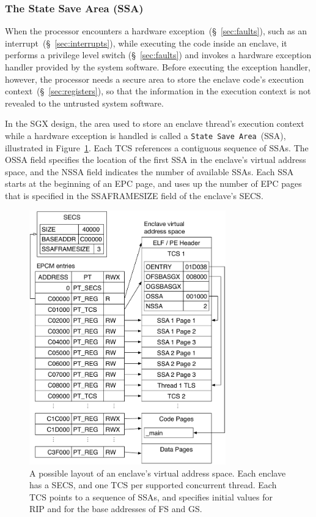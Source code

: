 \subsubsection{The State Save Area (SSA)}
\label{sec:sgx_ssa}


When the processor encounters a hardware exception~(\S~\ref{sec:faults}), such
as an interrupt~(\S~\ref{sec:interrupts}), while executing the code inside an
enclave, it performs a privilege level switch (\S~\ref{sec:faults}) and invokes
a hardware exception handler provided by the system software. Before executing
the exception handler, however, the processor needs a secure area to store the
enclave code's execution context~(\S~\ref{sec:registers}), so that the
information in the execution context is not revealed to the untrusted system
software.


In the SGX design, the area used to store an enclave thread's execution context
while a hardware exception is handled is called a \texttt{State Save
Area}~(SSA), illustrated in Figure~\ref{fig:sgx_enclave_layout}. Each TCS
references a contiguous sequence of SSAs. The OSSA field specifies the location
of the first SSA in the enclave's virtual address space, and the NSSA field
indicates the number of available SSAs. Each SSA starts at the beginning of an
EPC page, and uses up the number of EPC pages that is specified in the
SSAFRAMESIZE field of the enclave's SECS.

\begin{figure}[hbt]
  \centering
  \includegraphics[width=85mm]{figures/sgx_enclave_layout.pdf}
  \caption{
    A possible layout of an enclave's virtual address space. Each enclave has a
    SECS, and one TCS per supported concurrent thread. Each TCS points to a
    sequence of SSAs, and specifies initial values for RIP and for the base
    addresses of FS and GS.
  }
  \label{fig:sgx_enclave_layout}
\end{figure}

